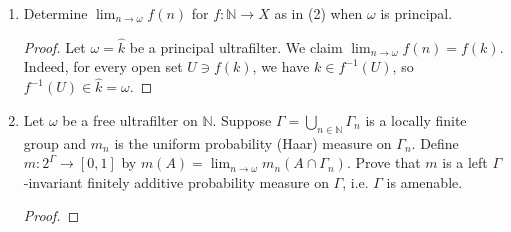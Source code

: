 \documentclass[a4paper,10pt]{report}
\newcommand{\N}{\mathbb{N}}
\begin{document}
\begin{enumerate}
\begin{enumerate}
\begin{proof}
					We claim that $\omega = \widehat{n} := \{A : n \in A\}$.
					First, $\widehat{n}$ is a filter.
					On the other hand, if $A \in \omega$, then $A \cap \{n\} \in \omega$,
					so $n \in A$.
					Hence, $\omega \subseteq \widehat{n}$.
					Since $\omega$ is an ultrafilter (and therefore a maximal filter),
					we must have $\omega = \widehat{n}$.
				\end{proof}
			\item Determine $\lim_{n \to \omega}{f(n)}$ for $f : \N \to X$ as in (2)
				when $\omega$ is principal.
				\begin{proof}
					Let $\omega = \widehat{k}$ be a principal ultrafilter.
					We claim $\lim_{n \to \omega}{f(n)} = f(k)$.
					Indeed, for every open set $U \ni f(k)$, we have
					$k \in f^{-1}(U)$, so $f^{-1}(U) \in \widehat{k} = \omega$.
				\end{proof}
			\item Let $\omega$ be a free ultrafilter on $\N$.
				Suppose $\Gamma = \bigcup_{n \in \N}{\Gamma_n}$ is a locally finite group
				and $m_n$ is the uniform probability (Haar) measure on $\Gamma_n$.
				Define $m : 2^{\Gamma} \to [0,1]$ by
				$m(A) = \lim_{n \to \omega}{m_n(A \cap \Gamma_n)}$.
				Prove that $m$ is a left $\Gamma$-invariant finitely additive probability measure
				on $\Gamma$, i.e. $\Gamma$ is amenable.
				\begin{proof}
					
				\end{proof}
		\end{enumerate}
\end{enumerate}
\end{document}
